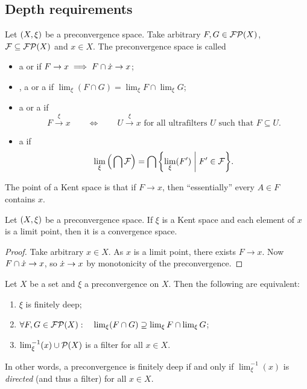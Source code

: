 \subsection{Depth requirements}
\begin{definition}
Let $\sSet{X,\xi}$ be a preconvergence space. Take arbitrary $F,G \in \operatorname{\mathcal{FP}}(X)$, $\mathcal{F}\subseteq \operatorname{\mathcal{FP}}(X)$ and $x\in X$. The preconvergence space is called
\begin{itemize}
\item a  or  if $F \to x \implies F\cap \dot{x} \to x$;
\item {}, a   or a  if $\lim_\xi(F\cap G) = \lim_\xi F \cap \lim_\xi G$;
\item a  or a  if
\[ F\overset{\xi}{\longrightarrow} x \qquad\iff\qquad \text{$U\overset{\xi}{\longrightarrow} x$ for all ultrafilters $U$ such that $F\subseteq U$.} \]
\item a  if 
\[ \lim_\xi\Big(\bigcap \mathcal{F}\Big) = \bigcap \setbuilder{\lim_\xi(F')}{F'\in \mathcal{F}}. \]
\end{itemize}
\end{definition}

The point of a Kent space is that if $F\to x$, then ``essentially'' every $A\in F$ contains $x$.

\begin{lemma}
Let $\sSet{X,\xi}$ be a preconvergence space. If $\xi$ is a Kent space and each element of $x$ is a limit point, then it is a convergence space.
\end{lemma}
\begin{proof}
Take arbitrary $x\in X$. As $x$ is a limit point, there exists $F\to x$. Now $F\cap \dot{x} \to x$, so $\dot{x} \to x$ by monotonicity of the preconvergence.
\end{proof}

\begin{lemma} \label{finiteDepthLemma}
Let $X$ be a set and $\xi$ a preconvergence on $X$. Then the following are equivalent:
\begin{enumerate}
\item $\xi$ is finitely deep;
\item $\forall F,G \in \operatorname{\mathcal{FP}}(X): \quad \lim_\xi(F\cap G) \supseteq \lim_\xi F \cap \lim_\xi G$;
\item $\lim_\xi^{-1}(x)\cup \operatorname{\mathcal{P}}(X)$ is a filter for all $x\in X$.
\end{enumerate}
\end{lemma}
In other words, a preconvergence is finitely deep \textup{if and only if} $\lim_\xi^{-1}(x)$ is \emph{directed} (and thus a filter) for all $x\in X$.

